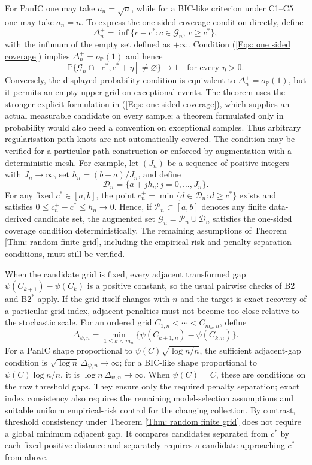 \documentclass[12pt]{article}
\newenvironment{bluechange}{\begingroup\color[rgb]{0.00,0.00,1.00}}{\endgroup}
\theoremstyle{remark}
\theoremstyle{plain}
\begin{document}
\begin{bluechange}
For PanIC one may take $a_n=\sqrt n$, while for a BIC-like criterion under C1--C5 one may take $a_n=n$. To express the one-sided coverage condition directly, define
\[
\Delta_n^+=\inf\{c-c^*:c\in\mathcal G_n,\ c\ge c^*\},
\]
with the infimum of the empty set defined as $+\infty$. Condition (\ref{Eqs: one sided coverage}) implies $\Delta_n^+=o_{\mathbb P}(1)$ and hence
\[
\mathbb P\{\mathcal G_n\cap[c^*,c^*+\eta]\ne\varnothing\}\longrightarrow1
\quad\text{for every }\eta>0.
\]
Conversely, the displayed probability condition is equivalent to $\Delta_n^+=o_{\mathbb P}(1)$, but it permits an empty upper grid on exceptional events. The theorem uses the stronger explicit formulation in (\ref{Eqs: one sided coverage}), which supplies an actual measurable candidate on every sample; a theorem formulated only in probability would also need a convention on exceptional samples. Thus arbitrary regularisation-path knots are not automatically covered. The condition may be verified for a particular path construction or enforced by augmentation with a deterministic mesh. For example, let $(J_n)$ be a sequence of positive integers with $J_n\to\infty$, set $h_n=(b-a)/J_n$, and define
\[
\mathcal D_n=\{a+jh_n: j=0,\ldots,J_n\}.
\]
For any fixed $c^*\in[a,b]$, the point $c_n^+=\min\{d\in\mathcal D_n:d\ge c^*\}$ exists and satisfies $0\le c_n^+-c^*\le h_n\to0$. Hence, if $\mathcal P_n\subset[a,b]$ denotes any finite data-derived candidate set, the augmented set $\mathcal G_n=\mathcal P_n\cup\mathcal D_n$ satisfies the one-sided coverage condition deterministically. The remaining assumptions of Theorem \ref{Thm: random finite grid}, including the empirical-risk and penalty-separation conditions, must still be verified.

When the candidate grid is fixed, every adjacent transformed gap $\psi(C_{k+1})-\psi(C_k)$ is a positive constant, so the usual pairwise checks of B2 and $\mathrm{B2}^*$ apply. If the grid itself changes with $n$ and the target is exact recovery of a particular grid index, adjacent penalties must not become too close relative to the stochastic scale. For an ordered grid $C_{1,n}<\cdots<C_{m_n,n}$, define
\[
\Delta_{\psi,n}=\min_{1\le k<m_n}\{\psi(C_{k+1,n})-\psi(C_{k,n})\}.
\]
For a PanIC shape proportional to $\psi(C)\sqrt{\log n/n}$, the sufficient adjacent-gap condition is $\sqrt{\log n}\,\Delta_{\psi,n}\to\infty$; for a BIC-like shape proportional to $\psi(C)\log n/n$, it is $\log n\,\Delta_{\psi,n}\to\infty$. When $\psi(C)=C$, these are conditions on the raw threshold gaps. They ensure only the required penalty separation; exact index consistency also requires the remaining model-selection assumptions and suitable uniform empirical-risk control for the changing collection. By contrast, threshold consistency under Theorem \ref{Thm: random finite grid} does not require a global minimum adjacent gap. It compares candidates separated from $c^*$ by each fixed positive distance and separately requires a candidate approaching $c^*$ from above.


\end{bluechange}
\end{document}
